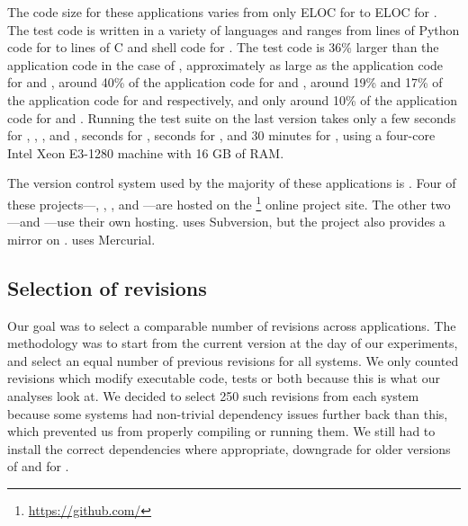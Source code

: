 The code size for these applications varies from only \beanstalkdSize ELOC for
\beanstalkd to \gitSize ELOC for \git.  The test code is written in a variety
of languages and ranges from \beanstalkdTsize lines of Python code for
\beanstalkd to \gitTsize lines of C and shell code for \git.  The test code is
36\% larger than the application code in the case of \git, approximately as
large as the application code for \beanstalkd and \memcached, around 40\% of
the application code for \redis and \zeromq, around 19\% and 17\% of the
application code for \binutils and \lighttpd respectively, and only around 10\%
of the application code for \lighttpdtwo and \vim.  Running the test suite on
the last version takes only a few seconds for \binutils, \lighttpd,
\lighttpdtwo, \vim and \zeromq, \memcachedTestTime seconds for \memcached,
\redisTestTime seconds for \redis, and 30 minutes for \git, using a four-core
Intel Xeon E3-1280 machine with 16 GB of RAM.

The version control system used by the majority of these applications is \git.
Four of these projects---\git, \memcached, \redis, and \zeromq ---are hosted on
the \github\footnote{\url{https://github.com/}} online project site.  The other
two---\binutils and \lighttpdtwo---use their own \git hosting. \lighttpd uses
Subversion, but the project also provides a \git mirror on \github. \vim uses
Mercurial.

\subsection{Selection of revisions}

Our goal was to select a comparable number of revisions across applications.
The methodology was to start from the current version at the day of our
experiments, and select an equal number of previous revisions for all systems.
We only counted revisions which modify executable code, tests or both because
this is what our analyses look at. We decided to select 250 such revisions from
each system because some systems had non-trivial dependency issues further back
than this, which prevented us from properly compiling or running them.  We
still had to install the correct dependencies where appropriate, \eg downgrade
 for older versions of \lighttpdtwo and  for
\memcached.

